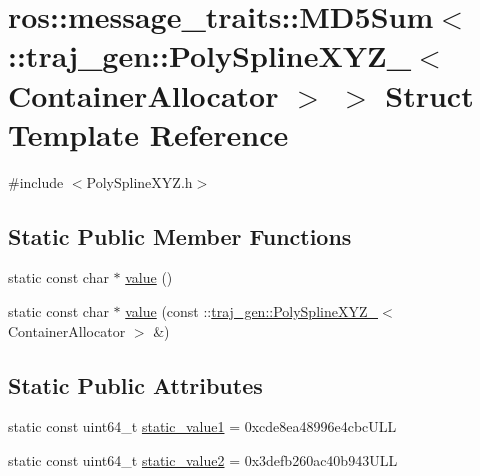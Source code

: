 \hypertarget{structros_1_1message__traits_1_1_m_d5_sum_3_01_1_1traj__gen_1_1_poly_spline_x_y_z___3_01_container_allocator_01_4_01_4}{}\section{ros\+:\+:message\+\_\+traits\+:\+:M\+D5\+Sum$<$ \+:\+:traj\+\_\+gen\+:\+:Poly\+Spline\+X\+Y\+Z\+\_\+$<$ Container\+Allocator $>$ $>$ Struct Template Reference}
\label{structros_1_1message__traits_1_1_m_d5_sum_3_01_1_1traj__gen_1_1_poly_spline_x_y_z___3_01_container_allocator_01_4_01_4}


{\ttfamily \#include $<$Poly\+Spline\+X\+Y\+Z.\+h$>$}

\subsection*{Static Public Member Functions}
\begin{DoxyCompactItemize}
\item 
static const char $\ast$ \hyperlink{structros_1_1message__traits_1_1_m_d5_sum_3_01_1_1traj__gen_1_1_poly_spline_x_y_z___3_01_container_allocator_01_4_01_4_a5345ec883a07ef4d055c0ba6f52564f5}{value} ()
\item 
static const char $\ast$ \hyperlink{structros_1_1message__traits_1_1_m_d5_sum_3_01_1_1traj__gen_1_1_poly_spline_x_y_z___3_01_container_allocator_01_4_01_4_a3d6191b185ef7291953276217087136b}{value} (const \+::\hyperlink{structtraj__gen_1_1_poly_spline_x_y_z__}{traj\+\_\+gen\+::\+Poly\+Spline\+X\+Y\+Z\+\_\+}$<$ Container\+Allocator $>$ \&)
\end{DoxyCompactItemize}
\subsection*{Static Public Attributes}
\begin{DoxyCompactItemize}
\item 
static const uint64\+\_\+t \hyperlink{structros_1_1message__traits_1_1_m_d5_sum_3_01_1_1traj__gen_1_1_poly_spline_x_y_z___3_01_container_allocator_01_4_01_4_a6e094b8beb8470216f994cadea40f999}{static\+\_\+value1} = 0xcde8ea48996e4cbc\+U\+LL
\item 
static const uint64\+\_\+t \hyperlink{structros_1_1message__traits_1_1_m_d5_sum_3_01_1_1traj__gen_1_1_poly_spline_x_y_z___3_01_container_allocator_01_4_01_4_acf5fc651d4900d74885fff4fc3839676}{static\+\_\+value2} = 0x3defb260ac40b943\+U\+LL
\end{DoxyCompactItemize}


